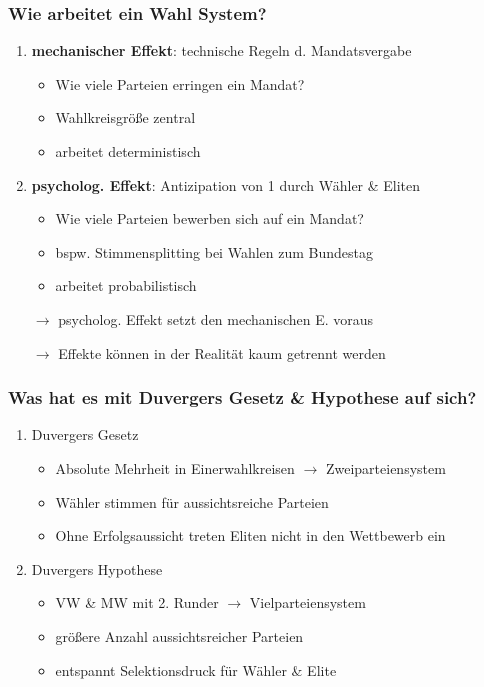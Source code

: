 \documentclass{beamer}
\begin{document}
\begin{frame}
  \frametitle{Wie arbeitet ein Wahl System?}
  \begin{enumerate}
    \item \textbf{mechanischer Effekt}: technische Regeln d. Mandatsvergabe
    \begin{itemize}
      \item Wie viele Parteien erringen ein Mandat?
      \item Wahlkreisgröße zentral
      \item arbeitet deterministisch
    \end{itemize}
    \item \textbf{psycholog. Effekt}: Antizipation von 1 durch Wähler \& Eliten
    \begin{itemize}
      \item Wie viele Parteien bewerben sich auf ein Mandat?
      \item bspw. Stimmensplitting bei Wahlen zum Bundestag
      \item arbeitet probabilistisch
    \end{itemize}
  \item [$\rightarrow$] psycholog. Effekt setzt den mechanischen E. voraus
  \item [$\rightarrow$] Effekte können in der Realität kaum getrennt werden
  \end{enumerate}
\end{frame}

\begin{frame}
  \frametitle{Was hat es mit Duvergers Gesetz \& Hypothese auf sich?}
  \begin{enumerate}
    \item Duvergers Gesetz
    \begin{itemize}
      \item Absolute Mehrheit in Einerwahlkreisen $\rightarrow$ Zweiparteiensystem
      \item Wähler stimmen für aussichtsreiche Parteien
      \item Ohne Erfolgsaussicht treten Eliten nicht in den Wettbewerb ein
    \end{itemize}
    \item Duvergers Hypothese
    \begin{itemize}
      \item VW \& MW mit 2. Runder $\rightarrow$ Vielparteiensystem
      \item größere Anzahl aussichtsreicher Parteien
      \item entspannt Selektionsdruck für Wähler \& Elite
    \end{itemize}
  \end{enumerate}
\end{frame}
\end{document}
